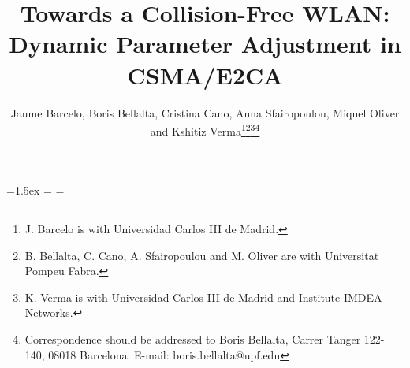 \documentclass[journal]{IEEEtran}
\begin{document}
\newdimen\snellbaselineskip
\newdimen\snellskip
\snellskip=1.5ex
\snellbaselineskip=\baselineskip
\def\srule{\omit\kern.5em\vrule\kern-.5em}
\newbox\bigstrutbox
\setbox\bigstrutbox=\hbox{\vrule height14.5pt depth9.5pt width0pt}
\def\bigstrut{\relax\ifmmode\copy\bigstrutbox\else\unhcopy\bigstrutbox\fi}
\def\middlehrule#1#2{\noalign{\kern-\snellbaselineskip\kern\snellskip}
&\multispan#1\strut\hrulefill
&\omit\hbox to.5em{\hrulefill}\vrule 
height \snellskip\kern-.5em&\multispan#2\hrulefill\cr}

\makeatletter
\def\bordermatrix#1{\begingroup \m@th
  \@tempdima 8.75\p@
  \setbox\z@\vbox{\def\cr{\crcr\noalign{\kern2\p@\global\let\cr\endline}}\ialign{\hfil\kern2\p@\kern\@tempdima&\thinspace\hfil\hfil
      &&\quad\hfil\hfil\crcr
      \omit\strut\hfil\crcr\noalign{\kern-\snellbaselineskip}#1\crcr\omit\strut\cr}}\setbox\tw@\vbox{\unvcopy\z@\global\setbox\@ne\lastbox}\setbox\tw@\hbox{\unhbox\@ne\unskip\global\setbox\@ne\lastbox}\setbox\tw@\hbox{}\null\;\vbox{\kern\ht\@ne\box\tw@}\endgroup}
\makeatletter

\makeatletter
\def\bordermatrix#1{\begingroup \m@th
  \@tempdima 8.75\p@
  \setbox\z@\vbox{\def\cr{\crcr\noalign{\kern2\p@\global\let\cr\endline}}\ialign{\hfil\kern2\p@\kern\@tempdima&\thinspace\hfil\hfil
      &&\quad\hfil\hfil\crcr
      \omit\strut\hfil\crcr\noalign{\kern-\snellbaselineskip}#1\crcr\omit\strut\cr}}\setbox\tw@\vbox{\unvcopy\z@\global\setbox\@ne\lastbox}\setbox\tw@\hbox{\unhbox\@ne\unskip\global\setbox\@ne\lastbox}\setbox\tw@\hbox{}\null\;\vbox{\kern\ht\@ne\box\tw@}\endgroup}
\makeatletter

\title{Towards a Collision-Free WLAN: Dynamic Parameter Adjustment in CSMA/E2CA}


\author{
Jaume Barcelo, Boris Bellalta, Cristina Cano, Anna Sfairopoulou, Miquel Oliver and Kshitiz Verma\thanks{J. Barcelo is with Universidad Carlos III de Madrid.}\thanks{B. Bellalta, C. Cano, A. Sfairopoulou and M. Oliver are with Universitat Pompeu Fabra.}\thanks{K. Verma is with Universidad Carlos III de Madrid and Institute IMDEA Networks.}\thanks{Correspondence should be addressed to Boris Bellalta, Carrer Tanger 122-140, 08018 Barcelona. E-mail: boris.bellalta@upf.edu}
}





\end{document}
